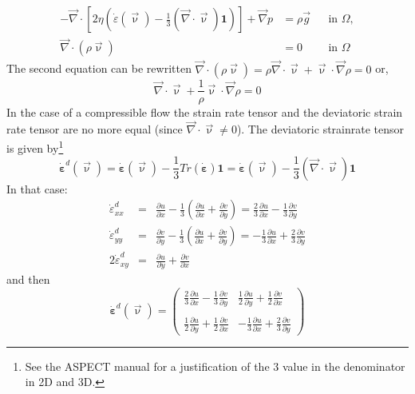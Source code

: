\documentclass[a4paper,12pt]{article}
\begin{document}
\begin{align}
-\vec\nabla \cdot \left[ 2\eta \left(\dot\varepsilon(\vec \upnu) 
-\frac{1}{3}(\vec\nabla \cdot \vec{\upnu}) \mathbf 1\right) \right] + \vec\nabla p &=  \rho \vec{g}
  &
  & \textrm{in $\Omega$},
  \\  
  \vec\nabla \cdot (\rho \vec{\upnu}) &= 0
  &
  & \textrm{in $\Omega$}
\end{align}
The second equation can be rewritten 
$\vec\nabla \cdot (\rho \vec{\upnu}) =  \rho \vec\nabla \cdot \vec{\upnu} + \vec{\upnu} \cdot {\vec \nabla} \rho=0$
or, 
\[
\vec\nabla \cdot \vec{\upnu} + \frac{1}{\rho} \vec{\upnu} \cdot {\vec \nabla}\rho=0
\]
In the case of a compressible flow the strain rate tensor and the deviatoric strain rate tensor are no more equal (since ${\vec \nabla}\cdot{\vec\upnu} \neq 0$).
The deviatoric strainrate tensor is given by\footnote{See the ASPECT manual for a justification of the 3 value in the denominator in 2D and 3D.} 
\[
\dot{\bm \varepsilon}^d({\vec \upnu})=
\dot{\bm \varepsilon}({\vec \upnu})-\frac{1}{3} Tr(\dot{\bm \varepsilon}) {\bm 1}
=\dot{\bm \varepsilon}({\vec\upnu})-\frac{1}{3} ({\vec \nabla}\cdot{\vec\upnu}) {\bm 1}
\]
In that case:
\begin{eqnarray}
\dot{\varepsilon}_{xx}^d 
&=& \frac{\partial u}{\partial x}
-\frac{1}{3} \left( \frac{\partial u}{\partial x} + \frac{\partial v}{\partial y} \right) 
= \frac{2}{3}\frac{\partial u}{\partial x}
-\frac{1}{3} \frac{\partial v}{\partial y}
\\
\dot{\varepsilon}_{yy}^d 
&=& \frac{\partial v}{\partial y}
-\frac{1}{3} \left( \frac{\partial u}{\partial x} + \frac{\partial v}{\partial y} \right) 
=-\frac{1}{3} \frac{\partial u}{\partial x} 
+ \frac{2}{3} \frac{\partial v}{\partial y} 
\\
2\dot{\varepsilon}_{xy}^d 
&=& 
\frac{\partial u}{\partial y} 
+\frac{\partial v}{\partial x} 
\end{eqnarray}
and then 
\[
\dot{\bm \varepsilon}^d({\vec\upnu})
=
\left(
\begin{array}{cc}
\frac{2}{3} \frac{\partial u}{\partial x} -\frac{1}{3} \frac{\partial v}{\partial y} &
\frac{1}{2}\frac{\partial u}{\partial y} + \frac{1}{2}\frac{\partial v}{\partial x}  \\ \\
\frac{1}{2}\frac{\partial u}{\partial y} + \frac{1}{2}\frac{\partial v}{\partial x}  &
-\frac{1}{3} \frac{\partial u}{\partial x} +\frac{2}{3} \frac{\partial v}{\partial y} 
\end{array}
\right)
\]
\end{document}
